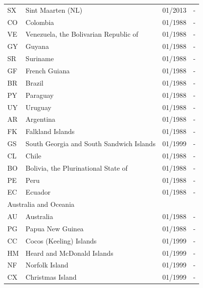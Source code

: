 \begin{footnotesize}
\begin{longtable}{p{0.5cm}p{9cm}p{2cm}p{2cm}}
SX	&	Sint Maarten (NL)	&	01/2013	&	-	\\

CO	&	Colombia	&	01/1988	&	-	\\

VE	&	Venezuela, the Bolivarian Republic of	&	01/1988	&	-	\\

GY	&	Guyana	&	01/1988	&	-	\\

SR	&	Suriname	&	01/1988	&	-	\\

GF	&	French Guiana	&	01/1988	&	-	\\

BR	&	Brazil	&	01/1988	&	-	\\

PY	&	Paraguay	&	01/1988	&	-	\\

UY	&	Uruguay	&	01/1988	&	-	\\

AR	&	Argentina	&	01/1988	&	-	\\

FK	&	Falkland Islands	&	01/1988	&	-	\\

GS	&	South Georgia and South Sandwich Islands	&	01/1999	&	-	\\

CL	&	Chile	&	01/1988	&	-	\\

BO	&	Bolivia, the Plurinational State of	&	01/1988	&	-	\\

PE	&	Peru	&	01/1988	&	-	\\

EC	&	Ecuador	&	01/1988	&	-	\\

\midrule
\multicolumn{3}{l}{Australia and Oceania}	&	\\
AU	&	Australia	&	01/1988	&	-	\\

PG	&	Papua New Guinea	&	01/1988	&	-	\\

CC	&	Cocos (Keeling) Islands	&	01/1999	&	-	\\

HM	&	Heard and McDonald Islands	&	01/1999	&	-	\\

NF	&	Norfolk Island	&	01/1999	&	-	\\

CX	&	Christmas Island	&	01/1999	&	-	\\


\end{longtable}
\end{footnotesize}
